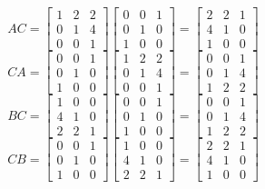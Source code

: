 \documentclass[12pt]{article}
\begin{document}
\[
AC =
\begin{bmatrix}
1 & 2 & 2\\
0 & 1 & 4\\
0 & 0 & 1
\end{bmatrix}
\begin{bmatrix}
0 & 0 & 1\\
0 & 1 & 0\\
1 & 0 & 0
\end{bmatrix}
=
\begin{bmatrix}
2 & 2 & 1\\
4 & 1 & 0\\
1 & 0 & 0
\end{bmatrix}
\] 
\[
CA =
\begin{bmatrix}
0 & 0 & 1\\
0 & 1 & 0\\
1 & 0 & 0
\end{bmatrix}
\begin{bmatrix}
1 & 2 & 2\\
0 & 1 & 4\\
0 & 0 & 1
\end{bmatrix}
=
\begin{bmatrix}
0 & 0 & 1\\
0 & 1 & 4\\
1 & 2 & 2
\end{bmatrix}
\]
\[
BC =
\begin{bmatrix}
1 & 0 & 0\\
4 & 1 & 0\\
2 & 2 & 1
\end{bmatrix}
\begin{bmatrix}
0 & 0 & 1\\
0 & 1 & 0\\
1 & 0 & 0
\end{bmatrix}
=
\begin{bmatrix}
0 & 0 & 1\\
0 & 1 & 4\\
1 & 2 & 2
\end{bmatrix}
\]
\[
CB =
\begin{bmatrix}
0 & 0 & 1\\
0 & 1 & 0\\
1 & 0 & 0
\end{bmatrix}
\begin{bmatrix}
1 & 0 & 0\\
4 & 1 & 0\\
2 & 2 & 1
\end{bmatrix}
=
\begin{bmatrix}
2 & 2 & 1\\
4 & 1 & 0\\
1 & 0 & 0
\end{bmatrix}
\]
\end{document}
